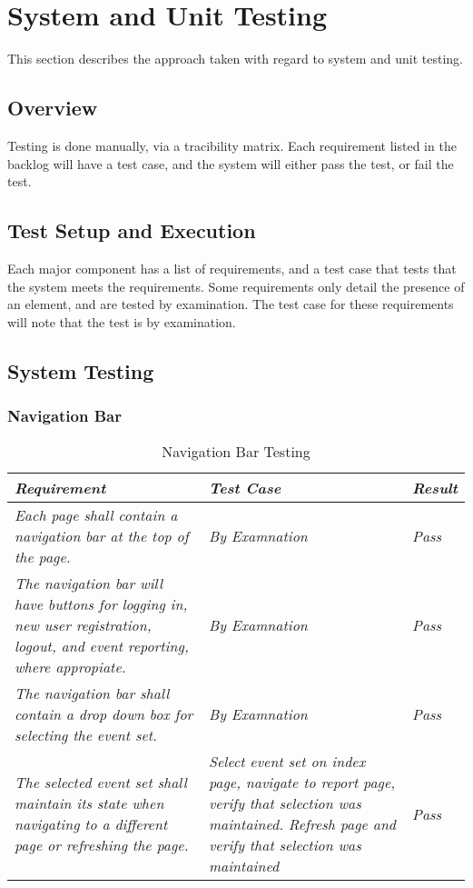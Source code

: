 

\chapter{System  and Unit Testing}

This section describes the approach taken with regard to system and unit testing. 

\section{Overview}
Testing is done manually, via a tracibility matrix. Each requirement listed in the backlog will have a test case, and the system will either pass the test, or fail the test. 

\section{Test Setup and Execution}
Each major component has a list of requirements, and a test case that tests that the system meets the requirements. Some requirements only detail the presence of an element, and are tested by examination. The test case for these requirements will note that the test is by examination. 

\section{System Testing}

\subsection{Navigation Bar}
\begin{table}[tbh]
\caption{Navigation Bar Testing \label{test_navbar}}
\begin{tabular}{|>{\raggedright}p{7cm}|>{\raggedright}p{7cm}|>{\raggedright}p{1cm}|}
\hline
\textit{\textbf{Requirement}} &  \textit{\textbf{Test Case}} & \textit{\textbf{Result}}  \tabularnewline
\hline
 \textit{Each page shall contain a navigation bar at the top of the page.} & \textit{By Examnation } & \textit{Pass} \tabularnewline
 \hline
 \textit{The navigation bar will have buttons for logging in, new user registration, logout, and event reporting, where appropiate.} & \textit{By Examnation } & \textit{Pass} \tabularnewline
\hline
 \textit{The navigation bar shall contain a drop down box for selecting the event set.} & \textit{By Examnation } & \textit{Pass} \tabularnewline
\hline
 \textit{The selected event set shall maintain its state when navigating to a different page or refreshing the page.} & \textit{Select event set on index page, navigate to report page, verify that selection was maintained. Refresh page and verify that selection was maintained } & \textit{Pass} \tabularnewline
\hline
\end{tabular}
\end{table}

